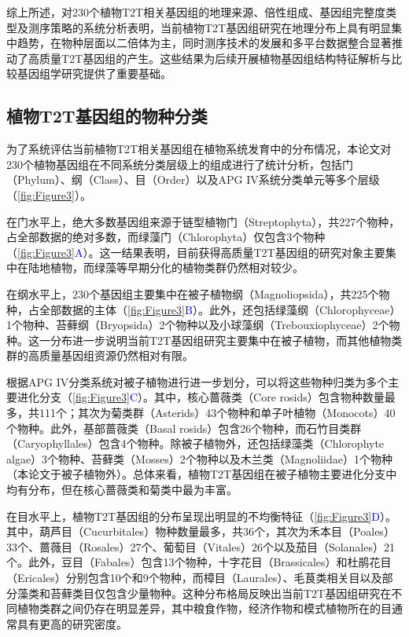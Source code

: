 综上所述，对230个植物T2T相关基因组的地理来源、倍性组成、基因组完整度类型及测序策略的系统分析表明，当前植物T2T基因组研究在地理分布上具有明显集中趋势，在物种层面以二倍体为主，同时测序技术的发展和多平台数据整合显著推动了高质量T2T基因组的产生。这些结果为后续开展植物基因组结构特征解析与比较基因组学研究提供了重要基础。

\subsection{植物T2T基因组的物种分类}

为了系统评估当前植物T2T相关基因组在植物系统发育中的分布情况，本论文对230个植物基因组在不同系统分类层级上的组成进行了统计分析，包括门（Phylum）、纲（Class）、目（Order）以及APG IV系统分类单元等多个层级（\textcolor{blue}{\autoref{fig:Figure3}}）。

在门水平上，绝大多数基因组来源于链型植物门（Streptophyta），共227个物种，占全部数据的绝对多数，而绿藻门（Chlorophyta）仅包含3个物种（\textcolor{blue}{\autoref{fig:Figure3}A}）。这一结果表明，目前获得高质量T2T基因组的研究对象主要集中在陆地植物，而绿藻等早期分化的植物类群仍然相对较少。

在纲水平上，230个基因组主要集中在被子植物纲（Magnoliopsida），共225个物种，占全部数据的主体（\textcolor{blue}{\autoref{fig:Figure3}B}）。此外，还包括绿藻纲（Chlorophyceae）1个物种、苔藓纲（Bryopsida）2个物种以及小球藻纲（Trebouxiophyceae）2个物种。这一分布进一步说明当前T2T基因组研究主要集中在被子植物，而其他植物类群的高质量基因组资源仍然相对有限。

根据APG IV分类系统对被子植物进行进一步划分\cite{angiosperm2016update}，可以将这些物种归类为多个主要进化分支（\textcolor{blue}{\autoref{fig:Figure3}C}）。其中，核心蔷薇类（Core rosids）包含物种数量最多，共111个；其次为菊类群（Asterids）43个物种和单子叶植物（Monocots）40个物种。此外，基部蔷薇类（Basal rosids）包含26个物种，而石竹目类群（Caryophyllales）包含4个物种。除被子植物外，还包括绿藻类（Chlorophyte algae）3个物种、苔藓类（Mosses）2个物种以及木兰类（Magnoliidae）1个物种（本论文于被子植物外）。总体来看，植物T2T基因组在被子植物主要进化分支中均有分布，但在核心蔷薇类和菊类中最为丰富。

在目水平上，植物T2T基因组的分布呈现出明显的不均衡特征（\textcolor{blue}{\autoref{fig:Figure3}D}）。其中，葫芦目（Cucurbitales）物种数量最多，共36个，其次为禾本目（Poales）33个、蔷薇目（Rosales）27个、葡萄目（Vitales）26个以及茄目（Solanales）21个。此外，豆目（Fabales）包含13个物种，十字花目（Brassicales）和杜鹃花目（Ericales）分别包含10个和9个物种，而樟目（Laurales）、毛茛类相关目以及部分藻类和苔藓类目仅包含少量物种。这种分布格局反映出当前T2T基因组研究在不同植物类群之间仍存在明显差异，其中粮食作物，经济作物和模式植物所在的目通常具有更高的研究密度。

